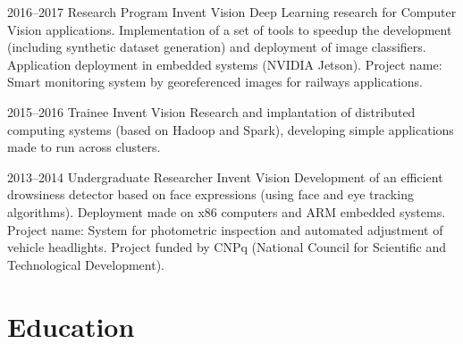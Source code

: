 \documentclass[a4paper]{cv-friggeri-x}
\begin{document}
\begin{entrylist}

\entry
    {2016--2017}
    {Research Program}%
    {Invent Vision}
    {Deep Learning research for Computer Vision applications. Implementation of a set of tools to speedup the development (including synthetic dataset generation) and deployment of image classifiers. Application deployment in embedded systems (NVIDIA Jetson). Project name: Smart monitoring system by georeferenced images for railways applications.}

\entry
    {2015--2016}
    {Trainee}
    {Invent Vision}
    {Research and implantation of distributed computing systems (based on Hadoop and Spark), developing simple applications made to run across clusters.}

\entry
    {2013--2014}
    {Undergraduate Researcher}
    {Invent Vision}
    {Development of an efficient drowsiness detector based on face expressions (using face and eye tracking algorithms). Deployment made on x86 computers and ARM embedded systems. Project name: System for photometric inspection and automated adjustment of vehicle headlights. Project funded by CNPq (National Council for Scientific and Technological Development).}



\end{entrylist}


\section{Education}
\end{document}
